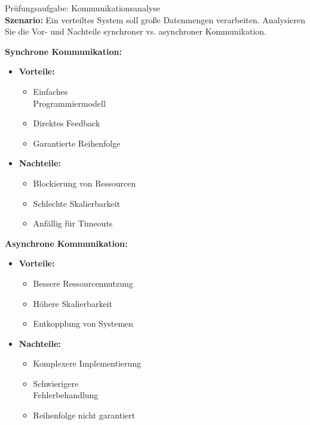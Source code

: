 \begin{example2}{Prüfungsaufgabe: Kommunikationsanalyse}\\
\textbf{Szenario:}
Ein verteiltes System soll große Datenmengen verarbeiten. Analysieren Sie die Vor- und Nachteile synchroner vs. asynchroner Kommunikation.

\begin{minipage}[t]{0.5\textwidth}
    \textbf{Synchrone Kommunikation:}
    \begin{itemize}
        \item \textbf{Vorteile:}
        \begin{itemize}
            \item Einfaches \\Programmiermodell
            \item Direktes Feedback
            \item Garantierte Reihenfolge
        \end{itemize}
        \item \textbf{Nachteile:}
        \begin{itemize}
            \item Blockierung von Ressourcen
            \item Schlechte Skalierbarkeit
            \item Anfällig für Timeouts
        \end{itemize}
    \end{itemize}
\end{minipage}
\begin{minipage}[t]{0.5\textwidth}
    \textbf{Asynchrone Kommunikation:}
    \begin{itemize}
        \item \textbf{Vorteile:}
        \begin{itemize}
            \item Bessere Ressourcennutzung
            \item Höhere Skalierbarkeit
            \item Entkopplung von Systemen
        \end{itemize}
        \item \textbf{Nachteile:}
        \begin{itemize}
            \item Komplexere Implementierung
            \item Schwierigere\\ Fehlerbehandlung
            \item Reihenfolge nicht garantiert
        \end{itemize}
    \end{itemize}
\end{minipage}
\end{example2}

